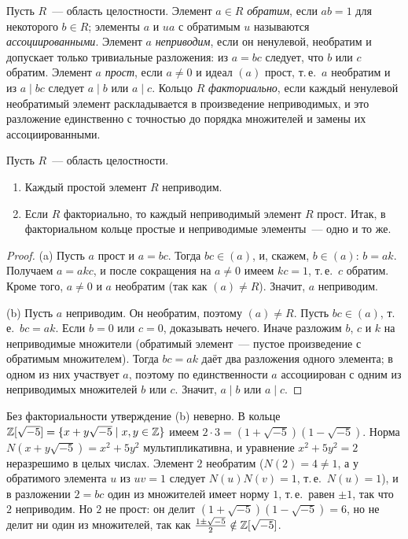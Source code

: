 \begin{definition}[1.0a]
Пусть $R$~--- область целостности. Элемент $a\in R$ \emph{обратим}, если $ab=1$ для некоторого $b\in R$; элементы $a$ и
$ua$ с обратимым $u$ называются \emph{ассоциированными}. Элемент $a$ \emph{неприводим}, если он ненулевой, необратим и
допускает только тривиальные разложения: из $a=bc$ следует, что $b$ или $c$ обратим. Элемент $a$ \emph{прост}, если
$a\ne0$ и идеал $(a)$ прост, т.\,е.\ $a$ необратим и из $a\mid bc$ следует $a\mid b$ или $a\mid c$. Кольцо $R$
\emph{факториально}, если каждый ненулевой необратимый элемент раскладывается в произведение неприводимых, и это
разложение единственно с точностью до порядка множителей и замены их ассоциированными.
\end{definition}

\begin{proposition}[1.0b]
Пусть $R$~--- область целостности.
\begin{enumerate}[label=(\alph*)]
\item Каждый простой элемент $R$ неприводим.
\item Если $R$ факториально, то каждый неприводимый элемент $R$ прост. Итак, в факториальном кольце простые и
неприводимые элементы~--- одно и то же.
\end{enumerate}
\end{proposition}

\begin{proof}
(a) Пусть $a$ прост и $a=bc$. Тогда $bc\in(a)$, и, скажем, $b\in(a)$: $b=ak$. Получаем $a=akc$, и после сокращения на
$a\ne0$ имеем $kc=1$, т.\,е.\ $c$ обратим. Кроме того, $a\ne0$ и $a$ необратим (так как $(a)\ne R$). Значит, $a$ неприводим.

(b) Пусть $a$ неприводим. Он необратим, поэтому $(a)\ne R$. Пусть $bc\in(a)$, т.\,е.\ $bc=ak$. Если $b=0$ или $c=0$,
доказывать нечего. Иначе разложим $b$, $c$ и $k$ на неприводимые множители (обратимый элемент~--- пустое произведение с
обратимым множителем). Тогда $bc=ak$ даёт два разложения одного элемента; в одном из них участвует $a$, поэтому по
единственности $a$ ассоциирован с одним из неприводимых множителей $b$ или $c$. Значит, $a\mid b$ или $a\mid c$.
\end{proof}

\begin{remark}
Без факториальности утверждение (b) неверно. В кольце $\mathbb Z[\sqrt{-5}]=\{x+y\sqrt{-5}\mid x,y\in\mathbb Z\}$ имеем
$2\cdot3=(1+\sqrt{-5})(1-\sqrt{-5})$. Норма $N(x+y\sqrt{-5})=x^2+5y^2$ мультипликативна, и уравнение $x^2+5y^2=2$
неразрешимо в целых числах. Элемент $2$ необратим ($N(2)=4\ne1$, а у обратимого элемента $u$ из $uv=1$ следует
$N(u)N(v)=1$, т.\,е.\ $N(u)=1$), и в разложении $2=bc$ один из множителей имеет норму $1$, т.\,е.\ равен $\pm1$, так
что $2$ неприводим. Но $2$ не прост: он делит $(1+\sqrt{-5})(1-\sqrt{-5})=6$, но не делит ни один из множителей, так как
$\tfrac{1\pm\sqrt{-5}}2\notin\mathbb Z[\sqrt{-5}]$.
\end{remark}

